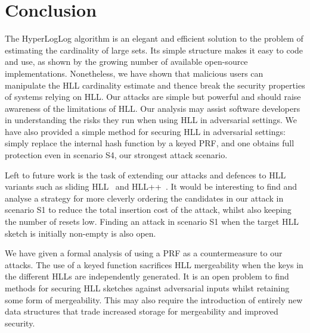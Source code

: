 \documentclass{article}
\begin{document}


\section{Conclusion}\label{sec:conclusions}
The HyperLogLog algorithm is an elegant and efficient solution to the problem of estimating the cardinality of large sets. Its simple structure makes it easy to code and use, as shown by the growing number of available open-source implementations. Nonetheless, we have shown that malicious users can manipulate the HLL cardinality estimate and thence break the security properties of systems relying on HLL. Our attacks are simple but powerful and should raise awareness of the limitations of HLL. Our analysis may assist software developers in understanding the risks they run when using HLL in adversarial settings. We have also provided a simple method for securing HLL in adversarial settings: simply replace the internal hash function by a keyed PRF, and one obtains full protection even in scenario S4, our strongest attack scenario.

Left to future work is the task of extending our attacks and defences to HLL variants such as sliding HLL~\cite{slidinghll} and HLL++~\cite{hllpractice}. It would be interesting to find and analyse a strategy for more cleverly ordering the candidates in our attack in scenario S1 to reduce the total insertion cost of the attack, whilst also keeping the number of resets low. Finding an attack in scenario S1 when the target HLL sketch is initially non-empty is also open.

We have given a formal analysis of using a PRF as a countermeasure to our attacks. The use of a keyed function sacrifices HLL mergeability when the keys in the different HLLs are independently generated. It is an open problem to find methods for securing HLL sketches against adversarial inputs whilst retaining some form of mergeability. This may also require the introduction of entirely new data structures that trade increased storage for mergeability and improved security. 
\end{document}
